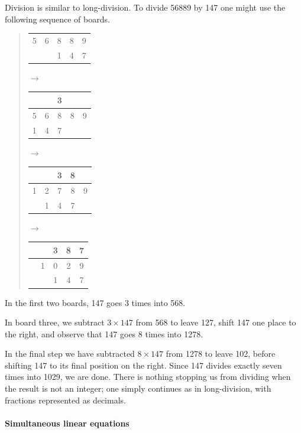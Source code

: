 Division is similar to long-division. To divide 56889 by 147 one might use the following sequence of boards.
\begin{quote}
  \begin{tabular}{|c|c|c|c|c|}
	  \hline
	  &&&&\\\hline
	  5&6&8&8&9\\\hline
	  &&1&4&7\\\hline
  \end{tabular} 
 	$\longrightarrow$
  \begin{tabular}{|c|c|c|c|c|}
	  \hline
	  &&3&&\\\hline
	  5&6&8&8&9\\\hline
	  1&4&7&&\\\hline
  \end{tabular}
  $\longrightarrow$
  \begin{tabular}{|c|c|c|c|c|}
	  \hline
	  &&3&8&\\\hline
	  1&2&7&8&9\\\hline
	  &1&4&7&\\\hline
  \end{tabular}
  $\longrightarrow$
  \begin{tabular}{|c|c|c|c|c|}
	  \hline
	  &&3&8&7\\\hline
	  &1&0&2&9\\\hline
	  &&1&4&7\\\hline
  \end{tabular}
\end{quote}
In the first two boards, 147 goes 3 times into 568.\par
In board three, we subtract $3\times 147$ from 568 to leave 127, shift 147 one place to the right, and observe that 147 goes 8 times into 1278.\par
In the final step we have subtracted $8\times 147$ from 1278 to leave 102, before shifting 147 to its final position on the right. Since 147 divides exactly seven times into 1029, we are done.\smallbreak
There is nothing stopping us from dividing when the result is not an integer; one simply continues as in long-division, with fractions represented as decimals.


\paragraph{Simultaneous linear equations}

